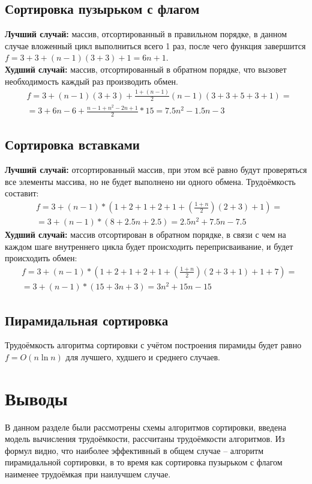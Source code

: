 \subsection{Сортировка пузырьком с флагом}
\label{subsec:bubble}
\textbf{Лучший случай:} массив, отсортированный в правильном порядке, в данном случае вложенный цикл выполниться всего 1 раз, после чего функция завершится $f=3+3+(n-1)(3+3)+1=6n+1$.\\
\textbf{Худший случай:} массив, отсортированный в обратном порядке, что вызовет необходимость каждый раз производить обмен.
\begin{equation}
\begin{split}
&f=3+(n-1)(3+3)+\frac{1+(n-1)}{2}(n-1)(3+3+5+3+1)=\\
&=3+6n-6+\frac{n-1+n^2-2n+1}{2}*15=7.5n^2-1.5n-3
\end{split}
\end{equation}
\subsection{Сортировка вставками}
\label{subsec:insertion}
\textbf{Лучший случай:} отсортированный массив, при этом всё равно будут проверяться все элементы массива, но не будет выполнено ни одного обмена. Трудоёмкость составит:
\begin{equation}
\begin{split}
&f=3+(n-1)*(1+2+1+2+1+(\frac{1+n}{2})(2+3)+1)=\\
&=3+(n-1)*(8+2.5n+2.5)=2.5n^2+7.5n-7.5
\end{split}
\end{equation}
\textbf{Худший случай:} массив отсортирован в обратном порядке, в связи с чем на каждом шаге внутреннего цикла будет происходить переприсваивание, и будет происходить обмен:
\begin{equation}
\begin{split}
&f=3+(n-1)*(1+2+1+2+1+(\frac{1+n}{2})(2+3+1)+1+7)=\\
&=3+(n-1)*(15+3n+3)=3n^2+15n-15
\end{split}
\end{equation}
\subsection{Пирамидальная сортировка}
\label{subsec:heap}
Трудоёмкость алгоритма сортировки с учётом построения пирамиды будет равно $f=O(n\ln n)$ для лучшего, худшего и среднего случаев.


\section{Выводы}
\label{sec:design_conclusion}
В данном разделе были рассмотрены схемы алгоритмов сортировки, введена модель вычисления трудоёмкости, рассчитаны трудоёмкости алгоритмов. Из формул видно, что наиболее эффективный в общем случае -- алгоритм пирамидальной сортировки, в то время как сортировка пузырьком с флагом наименее трудоёмкая при наилучшем случае.
